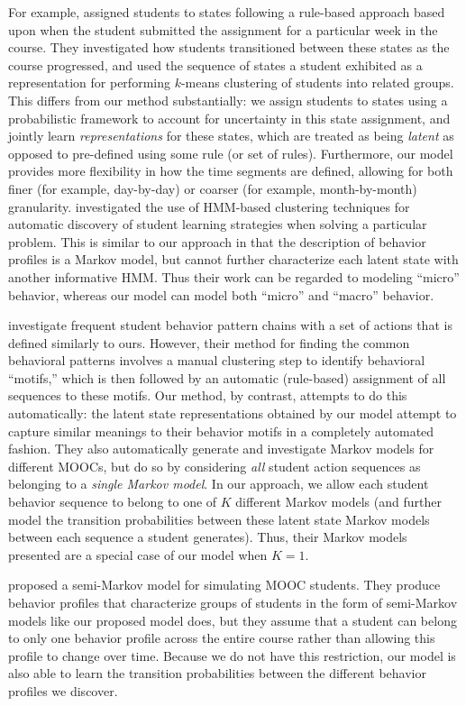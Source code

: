 For example, \citet{Kizilcec:2013:LAK} assigned students to states
following a rule-based approach based upon when the student submitted the
assignment for a particular week in the course. They investigated how
students transitioned between these states as the course progressed, and
used the sequence of states a student exhibited as a representation for
performing $k$-means clustering of students into related groups. This
differs from our method substantially: we assign students to states using a
probabilistic framework to account for uncertainty in this state
assignment, and jointly learn \emph{representations} for these states,
which are treated as being \emph{latent} as opposed to pre-defined using
some rule (or set of rules).  Furthermore, our model provides more
flexibility in how the time segments are defined, allowing for both finer
(for example, day-by-day) or coarser (for example, month-by-month)
granularity. \citet{Shih:2010:EDM} investigated the use of HMM-based
clustering techniques for automatic discovery of student learning
strategies when solving a particular problem.  This is similar to our
approach in that the description of behavior profiles is a Markov model,
but cannot further characterize each latent state with another informative
HMM. Thus their work can be regarded to modeling ``micro'' behavior,
whereas our model can model both ``micro'' and ``macro'' behavior.

\citet{Davis:2016:EDM} investigate frequent student behavior pattern chains
with a set of actions that is defined similarly to ours. However, their
method for finding the common behavioral patterns involves a manual
clustering step to identify behavioral ``motifs,'' which is then followed
by an automatic (rule-based) assignment of all sequences to these motifs.
Our method, by contrast, attempts to do this automatically: the latent
state representations obtained by our model attempt to capture similar
meanings to their behavior motifs in a completely automated fashion. They
also automatically generate and investigate Markov models for different
MOOCs, but do so by considering \emph{all} student action sequences as
belonging to a \emph{single Markov model}. In our approach, we allow each
student behavior sequence to belong to one of $K$ different Markov models
(and further model the transition probabilities between these latent state
Markov models between each sequence a student generates). Thus, their
Markov models presented are a special case of our model when $K = 1$.

\citet{Faucon:2016:EDM} proposed a semi-Markov model for simulating MOOC
students. They produce behavior profiles that characterize groups of
students in the form of semi-Markov models like our proposed model does,
but they assume that a student can belong to only one behavior profile
across the entire course rather than allowing this profile to change over
time. Because we do not have this restriction, our model is also able to
learn the transition probabilities between the different behavior profiles
we discover.

